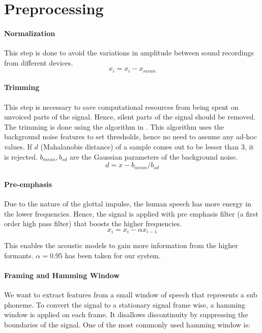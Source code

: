 \appendix

\chapter{Preprocessing}
\subsubsection{Normalization}
This step is done to avoid the variations in amplitude between sound recordings from different devices.
\begin{equation*} x_i = x_i - x_{mean} \end{equation*}

\subsubsection{Trimming}
This step is necessary to save computational resources from being spent on unvoiced parts of the signal. Hence, silent parts of the signal should be removed. The trimming is done using the algorithm in \cite{Saha_anew}. This algorithm uses the background noise features to set thresholds, hence no need to assume any ad-hoc values. If $d$ (Mahalanobis distance) of a sample comes out to be lesser than 3, it is rejected. $b_{mean}, b_{sd}$ are the Gaussian parameters of the background noise.
\begin{equation*} d = x - b_{mean} / b_{sd} \end{equation*}

\subsubsection{Pre-emphasis}
Due to the nature of the glottal impulse, the human speech has more energy in the lower frequencies. Hence, the signal is applied with pre emphasis filter (a first order high pass filter) that boosts the higher frequencies.
\begin{equation*} x_i = x_i - \alpha x_{i-1} \end{equation*}

This enables the acoustic models to gain more information from the higher formants. $\alpha = 0.95$ has been taken for our system. 

\subsubsection{Framing and Hamming Window}
We want to extract features from a small window of speech that represents a sub phoneme. To convert the signal to a stationary signal frame wise, a hamming window is applied on each frame. It disallows discontinuity by suppressing the boundaries of the signal. One of the most commonly used hamming window is:

